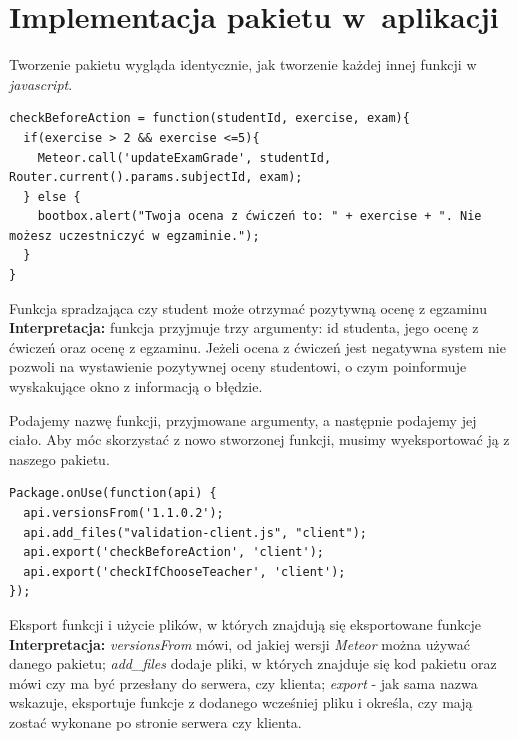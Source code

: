 \documentclass{xmgr}
\begin{document}
\cite{Packages}
\cite{MeteorDocs}
\cite{DiscoverMeteor2013}

\section{Implementacja pakietu w~aplikacji}

\indent \indent \indent Tworzenie pakietu wygląda identycznie, jak tworzenie każdej innej funkcji w \textit{javascript}.

\begin{listing}[H]
\begin{verbatim}
checkBeforeAction = function(studentId, exercise, exam){
  if(exercise > 2 && exercise <=5){
    Meteor.call('updateExamGrade', studentId, Router.current().params.subjectId, exam);
  } else {
    bootbox.alert("Twoja ocena z ćwiczeń to: " + exercise + ". Nie możesz uczestniczyć w egzaminie.");
  }
}
\end{verbatim}
\caption{Funkcja spradzająca czy student może otrzymać pozytywną ocenę z egzaminu \newline \newline \hspace{\linewidth} \textbf{Interpretacja:} funkcja przyjmuje trzy argumenty: id studenta, jego ocenę z ćwiczeń oraz ocenę z egzaminu. Jeżeli ocena z ćwiczeń jest negatywna system nie pozwoli na wystawienie pozytywnej oceny studentowi, o czym poinformuje wyskakujące okno z informacją o błędzie. \newline}
\end{listing}

Podajemy nazwę funkcji, przyjmowane argumenty, a następnie podajemy jej ciało. Aby móc skorzystać z nowo stworzonej funkcji, musimy wyeksportować ją z naszego pakietu.

\begin{listing}[H]
\begin{verbatim}
Package.onUse(function(api) {
  api.versionsFrom('1.1.0.2');
  api.add_files("validation-client.js", "client");
  api.export('checkBeforeAction', 'client');
  api.export('checkIfChooseTeacher', 'client');
});
\end{verbatim}
\caption{Eksport funkcji i użycie plików, w których znajdują się eksportowane funkcje \newline \newline \hspace{\linewidth} \textbf{Interpretacja:} \textit{versionsFrom} mówi, od jakiej wersji \textit{Meteor} można używać danego pakietu; \textit{add\_files} dodaje pliki, w których znajduje się kod pakietu oraz mówi czy ma być przesłany do serwera, czy klienta; \textit{export} - jak sama nazwa wskazuje, eksportuje funkcje z dodanego wcześniej pliku i określa, czy mają zostać wykonane po stronie serwera czy klienta.  \newline}
\end{listing}
\end{document}
